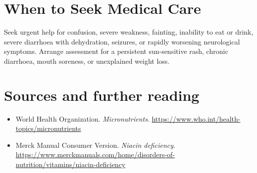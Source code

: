 \section*{When to Seek Medical Care}
Seek urgent help for confusion, severe weakness, fainting, inability to eat or drink, severe diarrhoea with dehydration, seizures, or rapidly worsening neurological symptoms. Arrange assessment for a persistent sun-sensitive rash, chronic diarrhoea, mouth soreness, or unexplained weight loss.

\section*{Sources and further reading}
\begin{itemize}
\item World Health Organization. \textit{Micronutrients}. \url{https://www.who.int/health-topics/micronutrients}
\item Merck Manual Consumer Version. \textit{Niacin deficiency}. \url{https://www.merckmanuals.com/home/disorders-of-nutrition/vitamins/niacin-deficiency}
\end{itemize}
